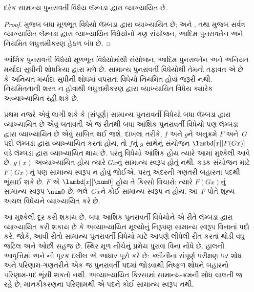 \begin{prop}
  દરેક સામાન્ય પુનરાવર્તી વિધેય લૅમ્બડા દ્વારા વ્યાખ્યાયિત છે.
\end{prop}

\begin{proof}
  મુજબ બધા મૂળભૂત વિધેયો
 લૅમ્બડા દ્વારા વ્યાખ્યાયિત છે; અને ,
  તથા  મુજબ
 સર્વત્ર વ્યાખ્યાયિત લૅમ્બડા દ્વારા વ્યાખ્યાયિત વિધેયોનો ગણ સંયોજન,
 આદિમ પુનરાવર્તન અને નિયમિત લઘુત્તમીકરણ હેઠળ
 બંધ છે.
\end{proof}
\endgroup

\begingroup
\makeatletter{}\makeatother

\label{guunit:OLP-0381}


આંશિક પુનરાવર્તી વિધેયો મૂળભૂત વિધેયોમાંથી
સંયોજન, આદિમ પુનરાવર્તન અને અનિયત મર્યાદા
સુધીની શોધક્રિયા દ્વારા મળે છે. સામાન્ય પુનરાવર્તી
વિધેયોથી તેમનો તફાવત એ છે કે અનિયત મર્યાદા સુધીની
શોધમાં વપરાતાં વિધેયો નિયમિત હોવાં જરૂરી નથી.
નિયમિતતાની શરત ન હોવાથી લઘુત્તમીકરણ દ્વારા
વ્યાખ્યાયિત વિધેય ક્યારેક અવ્યાખ્યાયિત રહી શકે છે.

પ્રથમ નજરે એવું લાગી શકે કે (સંપૂર્ણ) સામાન્ય પુનરાવર્તી
વિધેયો બધા લૅમ્બડા દ્વારા વ્યાખ્યાયિત છે એવું બતાવતી એ જ
રીતથી બધા આંશિક પુનરાવર્તી વિધેયો પણ
લૅમ્બડા દ્વારા વ્યાખ્યાયિત છે એવું સાબિત થઈ જશે.
દાખલા તરીકે, $f$ અને $g$ને અનુક્રમે $F$ અને~$G$
પદો લૅમ્બડા દ્વારા વ્યાખ્યાયિત કરતાં હોય, તો $f$નું $g$ સાથેનું
સંયોજન $\lambd[x][F (G x)]$ વડે લૅમ્બડા દ્વારા વ્યાખ્યાયિત
થાય છે. પરંતુ વિધેયો આંશિક હોય ત્યારે આમાં
મુશ્કેલી આવે છે. $g(x)$ અવ્યાખ્યાયિત હોય ત્યારે
$G x$નું સામાન્ય સ્વરૂપ હોતું નથી. કડક સંયોજન માટે
$F (G x)$નું પણ સામાન્ય સ્વરૂપ ન હોવું જોઈએ.
પરંતુ અંદરની ગણતરી બહારના પદથી ભૂંસાઈ શકે છે.
$F$ એ $\lambd[x][\num0]$ હોય તે કિસ્સો
વિચારો: ત્યારે $F (G x)$નું સામાન્ય સ્વરૂપ
$\num0$ છે, ભલે~$Gx$ને કોઈ સામાન્ય સ્વરૂપ ન હોય.
આ~$F$ પોતે શૂન્ય અચલ વિધેયને વ્યાખ્યાયિત કરે છે.

આ મુશ્કેલી દૂર કરી શકાય છે. બધા આંશિક પુનરાવર્તી
વિધેયોને એ રીતે લૅમ્બડા દ્વારા વ્યાખ્યાયિત કરી શકાય છે કે
અવ્યાખ્યાયિત મૂલ્યોનું નિરૂપણ સામાન્ય સ્વરૂપ
વિનાનાં પદો કરે. જોકે, આવી રીતો સામાન્ય પુનરાવર્તી
વિધેયો માટે આપણે લીધેલી રીત કરતાં થોડી વધુ
જટિલ અને ઓછી સહજ છે. સ્થિર મૂળ નીચેનું પ્રમેય પુરાવા
વિના નોંધે છે. હાલની આવૃત્તિમાં
 અને
ની પૂરક દલીલ એ આધાર પૂરો કરે છે:
ક્લીનીના સંપૂર્ણ પરીક્ષણ પર શોધ અને પરિણામ-ગણતરીને
એક જ પુનરાવર્તી પદમાં જોડવાથી નિષ્ફળ શોધને બહારનો
પરિણામ-પદ ભૂંસી શકતો નથી. અવ્યાખ્યાયિત કિસ્સામાં
સામાન્ય-ક્રમની શોધ ચાલતી જ રહે છે; માનકીકરણના પરિણામથી
એ પદને કોઈ સામાન્ય સ્વરૂપ નથી.

